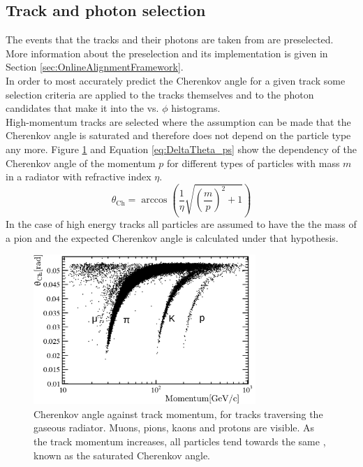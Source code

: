 \subsection{Track and photon selection}
\label{subsec:TrackSelection}
The events that the tracks and their photons are taken from are preselected. More information about the preselection and its implementation is given in Section \ref{sec:OnlineAlignmentFramework}.\\
In order to most accurately predict the Cherenkov angle for a given track some selection criteria are applied to the tracks themselves and to the photon candidates that make it into the \deltatheta vs. $\phi$ histograms.\\
High-momentum tracks are selected where the assumption can be made that the Cherenkov angle is saturated and therefore does not depend on the particle type any more. Figure \ref{fig:saturation} and Equation \ref{eq:DeltaTheta_ps} show the dependency of the Cherenkov angle of the momentum $p$ for different types of particles with mass $m$ in a radiator with refractive index $\eta$. 
\begin{equation}
  \label{eq:thetaC}
 \theta_{\mathrm{Ch}} = \arccos\left( \frac{1}{\eta} \sqrt{\left(\frac{m}{p}\right)^{2} + 1}  \right)
\end{equation}
In the case of high energy tracks all particles are assumed to have the the mass of a pion and the expected Cherenkov angle is calculated under that hypothesis.\\
\begin{figure}[htbp]
  \vspace{-0.5\baselineskip}
  \centering
  \includegraphics[width=0.75\textwidth]{figs/Method/ThetaVsMomentum_C4F10}
  \vspace{-0.5\baselineskip}
  \caption{
    Cherenkov angle \thetaC against track momentum, for tracks traversing the \richone gaseous radiator. Muons, pions, kaons and protons are visible. As the track momentum  increases, all particles tend towards the same \thetaC, known as the saturated Cherenkov angle.}
  \label{fig:saturation}
  \vspace{-0.5\baselineskip}
\end{figure}

